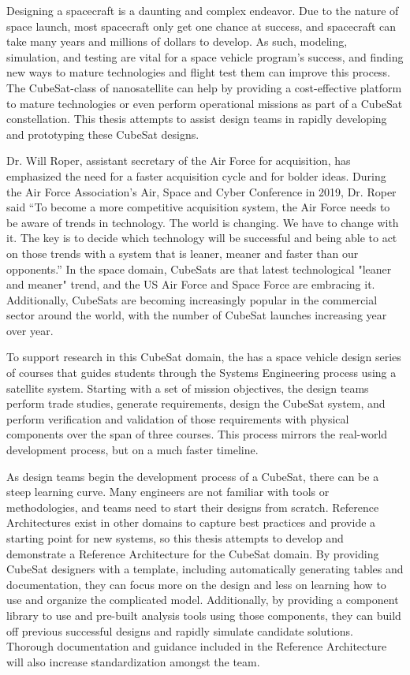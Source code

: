 Designing a spacecraft is a daunting and complex endeavor. Due to the nature of space launch, most spacecraft only get one chance at success, and spacecraft can take many years and millions of dollars to develop. As such, modeling, simulation, and testing are vital for a space vehicle program's success, and finding new ways to mature technologies and flight test them can improve this process. The CubeSat-class of nanosatellite can help by providing a cost-effective platform to mature technologies or even perform operational missions as part of a CubeSat constellation. This thesis attempts to assist design teams in rapidly developing and prototyping these CubeSat designs. 

Dr. Will Roper, assistant secretary of the Air Force for acquisition, has emphasized the need for a faster acquisition cycle and for bolder ideas. During the Air Force Association’s Air, Space and Cyber Conference in 2019, Dr. Roper said “To become a more competitive acquisition system, the Air Force needs to be aware of trends in technology. The world is changing. We have to change with it. The key is to decide which technology will be successful and being able to act on those trends with a system that is leaner, meaner and faster than our opponents.” \citep{Roper2019} In the space domain, CubeSats are that latest technological "leaner and meaner" trend, and the US Air Force and Space Force are embracing it. Additionally, CubeSats are becoming increasingly popular  in the commercial sector around the world, with the number of CubeSat launches increasing year over year.

To support research in this CubeSat domain, the  has a space vehicle design series of courses that guides students through the Systems Engineering process using a satellite system. Starting with a set of mission objectives, the design teams perform trade studies, generate requirements, design the CubeSat system, and perform verification and validation of those requirements with physical components over the span of three courses. This process mirrors the real-world development process, but on a much faster timeline. 

As design teams begin the development process of a CubeSat, there can be a steep learning curve. Many engineers are not familiar with  tools or methodologies, and teams need to start their designs from scratch. Reference Architectures exist in other domains to capture best practices and provide a starting point for new systems, so this thesis attempts to develop and demonstrate a Reference Architecture for the CubeSat domain. By providing CubeSat designers with a template, including automatically generating tables and documentation, they can focus more on the design and less on learning how to use and organize the complicated model. Additionally, by providing a component library to use and pre-built analysis tools using those components, they can build off previous successful designs and rapidly simulate candidate solutions. Thorough documentation and guidance included in the Reference Architecture will also increase standardization amongst the team. 

